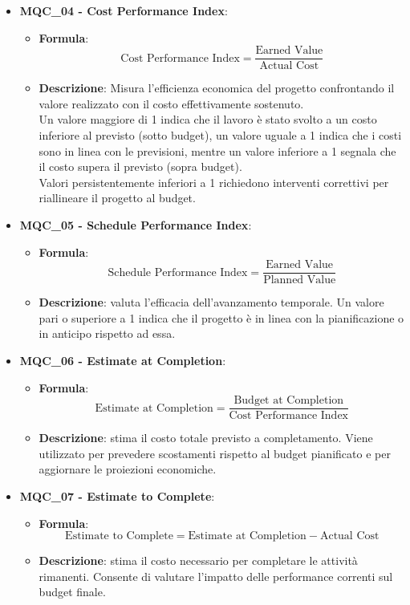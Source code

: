 \begin{itemize}
\item \textbf{MQC\_04 - Cost Performance Index}:
    \begin{itemize}
        \item \textbf{Formula}:
        \[
            \text{Cost Performance Index} =
            \frac{\text{Earned Value}}{\text{Actual Cost}}
        \]
        \item \textbf{Descrizione}: 
        Misura l'efficienza economica del progetto confrontando il valore realizzato con il costo effettivamente sostenuto.\\
        Un valore maggiore di 1 indica che il lavoro è stato svolto a un costo inferiore al previsto (sotto budget), un valore uguale a 1 indica che i costi sono in linea con le previsioni, mentre un valore inferiore a 1 segnala che il costo supera il previsto (sopra budget). \\
        Valori persistentemente inferiori a 1 richiedono interventi correttivi per riallineare il progetto al budget.
    \end{itemize}

\item \textbf{MQC\_05 - Schedule Performance Index}:
    \begin{itemize}
        \item \textbf{Formula}:
        \[
            \text{Schedule Performance Index} =
            \frac{\text{Earned Value}}{\text{Planned Value}}
        \]
        \item \textbf{Descrizione}: valuta l’efficacia dell’avanzamento temporale. Un valore pari o superiore a 1 indica che il progetto è in linea con la pianificazione o in anticipo rispetto ad essa.
    \end{itemize}

\item \textbf{MQC\_06 - Estimate at Completion}:
    \begin{itemize}
        \item \textbf{Formula}:
        \[
            \text{Estimate at Completion} = 
            \frac{\text{Budget at Completion}}{\text{Cost Performance Index}}
        \]
        \item \textbf{Descrizione}: stima il costo totale previsto a completamento. Viene utilizzato per prevedere scostamenti rispetto al budget pianificato e per aggiornare le proiezioni economiche.
    \end{itemize}

\item \textbf{MQC\_07 - Estimate to Complete}:
    \begin{itemize}
        \item \textbf{Formula}:
        \[
            \text{Estimate to Complete} = \text{Estimate at Completion} - \text{Actual Cost}
        \]
        \item \textbf{Descrizione}: stima il costo necessario per completare le attività rimanenti. Consente di valutare l’impatto delle performance correnti sul budget finale.
    \end{itemize}


\end{itemize}
